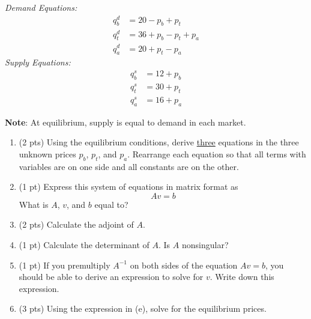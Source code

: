 \documentclass{./../../latex/tests}
\begin{document}
\begin{enumerate}
\textit{Demand Equations:}
\begin{align*}
q^d_b &= 20 - p_b + p_t \\
q^d_t &= 36 + p_b - p_t + p_a \\
q^d_a &= 20 + p_t - p_a
\end{align*}
\textit{Supply Equations:}
\begin{align*}
q^s_b &= 12 + p_b \\
q^s_t &= 30 + p_t \\
q^s_a &= 16 + p_a
\end{align*}

\textbf{Note}: At equilibrium, supply is equal to demand in each market.

\begin{enumerate}
\item (2 pts) Using the equilibrium conditions, derive \underline{three} equations in the three unknown prices $p_b$, $p_t$, and $p_a$. Rearrange each equation so that all terms with variables are on one side and all constants are on the other.
\newpage
\item (1 pt) Express this system of equations in matrix format as \[ Av = b \]
What is $A$, $v$, and $b$ equal to?
\vspace{4.5cm}
\item (2 pts) Calculate the adjoint of $A$.
\newpage
\item (1 pt) Calculate the determinant of $A$. Is $A$ nonsingular?
\vspace{5cm}
\item (1 pt) If you premultiply $A^{-1}$ on both sides of the equation $Av = b$, you should be able to derive an expression to solve for $v$. Write down this expression.
\vspace{2.5cm}
\item (3 pts) Using the expression in (e), solve for the equilibrium prices.
\end{enumerate}

\end{enumerate}
\end{document}
